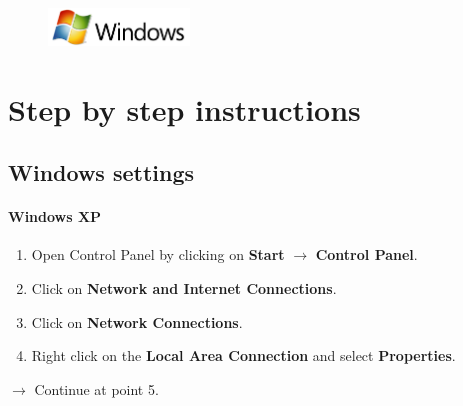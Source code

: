 \documentclass[a4paper,12pt]{scrartcl}
\newcommand{\optemph}[1]{\textbf{#1}}
\begin{document}
\newpage
\enlargethispage{20pt}

\begin{figure}[t!]
    \raggedleft
    \vspace{-20pt}
    \includegraphics[height=1cm,keepaspectratio]{Bilder/Windows_logo}
    \vspace{-20pt}
\end{figure}

\section*{Step by step instructions}
\subsection*{Windows settings}
\paragraph*{Windows XP}
\begin{enumerate}
	\item Open Control Panel by clicking on \optemph{Start} $\rightarrow$ \optemph{Control Panel}.
    \item Click on \optemph{Network and Internet Connections}.
	\item Click on \optemph{Network Connections}.
	\item Right click on the \optemph{Local Area Connection} and select \optemph{Properties}.
\end{enumerate}
$\rightarrow$ Continue at point 5.
\end{document}
